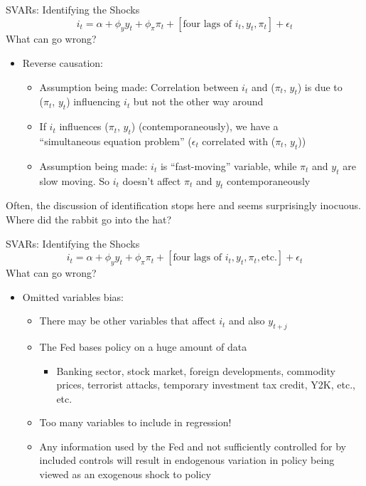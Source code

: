 \documentclass[11pt,aspectratio=169,xcolor={dvipsnames},hyperref={pdftex,pdfpagemode=UseNone,hidelinks,pdfdisplaydoctitle=true},usepdftitle=false]{beamer}
\begin{document}
\begin{frame}{SVARs: Identifying the Shocks}
	\[ i_{t} = \alpha + \phi_{y} y_{t} + \phi_{\pi} \pi_{t} + [\mbox{four lags of } i_{t}, y_{t}, \pi_{t}] + \epsilon_{t} \]
	What can go wrong? \pause
	\begin{itemize}
		\item Reverse causation:
		\begin{itemize}
			\item Assumption being made: Correlation between $i_{t}$ and ($\pi_{t}$, $y_{t}$) is due to \\ ($\pi_{t}$, $y_{t}$) influencing $i_{t}$ but not the other way around
			\item If $i_{t}$ influences ($\pi_{t}$, $y_{t}$) (contemporaneously), we have a \\ ``simultaneous equation problem'' ($\epsilon_{t}$ correlated with ($\pi_{t}$, $y_{t}$))
			\item Assumption being made: $i_{t}$ is ``fast-moving'' variable, while $\pi_{t}$ and $y_{t}$ are slow moving. So $i_{t}$ doesn't affect $\pi_{t}$ and $y_{t}$ contemporaneously
		\end{itemize} 
	\end{itemize} \pause
	Often, the discussion of identification stops here and seems surprisingly inocuous. Where did the rabbit go into the hat?
\end{frame}


\begin{frame}{SVARs: Identifying the Shocks}
	\[ i_{t} = \alpha + \phi_{y} y_{t} + \phi_{\pi} \pi_{t} + [\mbox{four lags of } i_{t}, y_{t}, \pi_{t}, \mbox{etc.}] + \epsilon_{t} \]
	What can go wrong?
	\begin{itemize}
		\addtocounter{enumi}{1}
		\item Omitted variables bias:
		\begin{itemize}
\item There may be other variables that affect $i_{t}$ and also $y_{t+j}$
\item The Fed bases policy on a huge amount of data
\begin{itemize}
\item Banking sector, stock market, foreign developments, commodity prices, terrorist attacks, temporary investment tax credit, Y2K, etc., etc. 
\end{itemize}
\item Too many variables to include in regression!
\item Any information used by the Fed and not sufficiently controlled for by \\ included controls will result in endogenous variation in policy being \\ viewed as an exogenous shock to policy
		\end{itemize}
	\end{itemize}
\end{frame}
\end{document}
